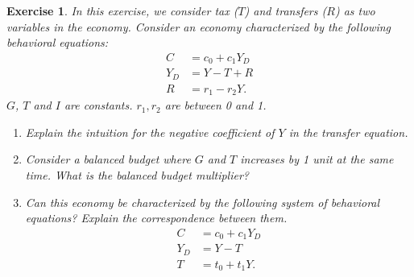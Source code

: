 \documentclass[12pt]{article}
\newtheorem{exercise}{Exercise}
\begin{document}
\begin{exercise}
    In this exercise, we consider tax ($T$) and transfers ($R$) as two variables in the economy. Consider an economy characterized by the following behavioral equations:
    \begin{align*}
        C &= c_0 + c_1 Y_D\\
        Y_D &= Y - T + R\\
        R &= r_1 - r_2 Y.
    \end{align*}
    $G$, $T$ and $I$ are constants. $r_1, r_2$ are between 0 and 1.
    \begin{enumerate}[label=(\arabic*)]
        \item Explain the intuition for the negative coefficient of $Y$ in the transfer equation.
        \item Consider a balanced budget where $G$ and $T$ increases by 1 unit at the same time. What is the balanced budget multiplier? 
        \item Can this economy be characterized by the following system of behavioral equations? Explain the correspondence between them.
        \begin{align*}
            C &= c_0 + c_1 Y_D\\
            Y_D &= Y - T\\
            T &= t_0 + t_1 Y.
        \end{align*}
    \end{enumerate}
\end{exercise}
\end{document}
